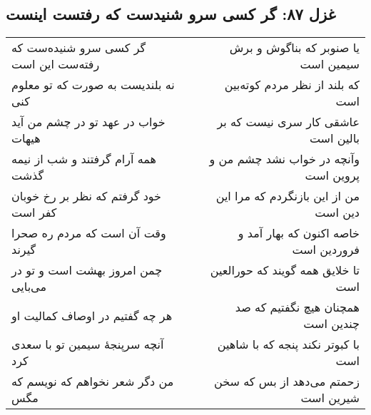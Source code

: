 \begin{center}
\section*{غزل ۸۷: گر کسی سرو شنیدست که رفتست اینست}
\label{sec:087}
\begin{longtable}{l p{0.5cm} r}
گر کسی سرو شنیده‌ست که رفته‌ست این است
&&
یا صنوبر که بناگوش و برش سیمین است
\\
نه بلندیست به صورت که تو معلوم کنی
&&
که بلند از نظر مردم کوته‌بین است
\\
خواب در عهد تو در چشم من آید هیهات
&&
عاشقی کار سری نیست که بر بالین است
\\
همه آرام گرفتند و شب از نیمه گذشت
&&
وآنچه در خواب نشد چشم من و پروین است
\\
خود گرفتم که نظر بر رخ خوبان کفر است
&&
من از این بازنگردم که مرا این دین است
\\
وقت آن است که مردم ره صحرا گیرند
&&
خاصه اکنون که بهار آمد و فروردین است
\\
چمن امروز بهشت است و تو در می‌بایی
&&
تا خلایق همه گویند که حورالعین است
\\
هر چه گفتیم در اوصاف کمالیت او
&&
همچنان هیچ نگفتیم که صد چندین است
\\
آنچه سرپنجهٔ سیمین تو با سعدی کرد
&&
با کبوتر نکند پنجه که با شاهین است
\\
من دگر شعر نخواهم که نویسم که مگس
&&
زحمتم می‌دهد از بس که سخن شیرین است
\\
\end{longtable}
\end{center}
